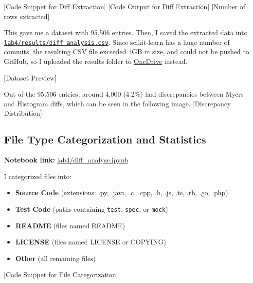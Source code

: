 \documentclass[10pt,a4paper]{report}
\begin{document}
[Code Snippet for Diff Extraction]
[Code Output for Diff Extraction]
[Number of rows extracted]

This gave me a dataset with 95,506 entries. Then, I saved the extracted data into \href{https://iitgnacin-my.sharepoint.com/:f:/g/personal/23110297_iitgn_ac_in/EoSVKnmVOgBFgk962nYvEUsBtuecB5xT6tOSazlldOD6YA?e=UOsFIl}{\texttt{lab4/results/diff\_analysis.csv}}. Since scikit-learn has a huge number of commits, the resulting CSV file exceeded 1GB in size, and could not be pushed to GitHub, so I uploaded the results folder to \href{https://iitgnacin-my.sharepoint.com/:f:/g/personal/23110297_iitgn_ac_in/EoSVKnmVOgBFgk962nYvEUsBtuecB5xT6tOSazlldOD6YA?e=UOsFIl}{OneDrive} instead.

[Dataset Preview]

Out of the 95,506 entries, around 4,000 (4.2\%) had discrepancies between Myers and Histogram diffs, which can be seen in the following image.
[Discrepancy Distribution]




\subsection{File Type Categorization and Statistics}

\textbf{Notebook link:} \href{https://github.com/ShardulJunagade/cs202-stt/blob/main/lab4/diff_analyse.ipynb}{lab4/diff\_analyse.ipynb}


I categorized files into:
\begin{itemize}[itemsep=0em, topsep=0pt]
    \item \textbf{Source Code} (extensions: .py, .java, .c, .cpp, .h, .js, .ts, .rb, .go, .php) 
    \item \textbf{Test Code} (paths containing \texttt{test}, \texttt{spec}, or \texttt{mock})  
    \item \textbf{README} (files named README)  
    \item \textbf{LICENSE} (files named LICENSE or COPYING)  
    \item \textbf{Other} (all remaining files)
\end{itemize}

[Code Snippet for File Categorization]
\end{document}
